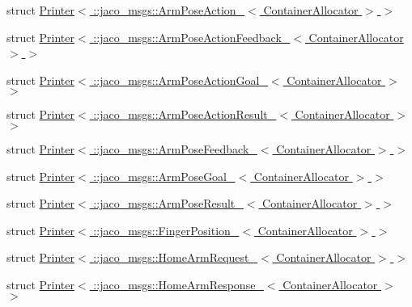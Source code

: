 \begin{DoxyCompactItemize}
\item 
struct \hyperlink{structros_1_1message__operations_1_1Printer_3_01_1_1jaco__msgs_1_1ArmPoseAction___3_01ContainerAllocator_01_4_01_4}{Printer$<$ \+::jaco\+\_\+msgs\+::\+Arm\+Pose\+Action\+\_\+$<$ Container\+Allocator $>$ $>$}
\item 
struct \hyperlink{structros_1_1message__operations_1_1Printer_3_01_1_1jaco__msgs_1_1ArmPoseActionFeedback___3_01ContainerAllocator_01_4_01_4}{Printer$<$ \+::jaco\+\_\+msgs\+::\+Arm\+Pose\+Action\+Feedback\+\_\+$<$ Container\+Allocator $>$ $>$}
\item 
struct \hyperlink{structros_1_1message__operations_1_1Printer_3_01_1_1jaco__msgs_1_1ArmPoseActionGoal___3_01ContainerAllocator_01_4_01_4}{Printer$<$ \+::jaco\+\_\+msgs\+::\+Arm\+Pose\+Action\+Goal\+\_\+$<$ Container\+Allocator $>$ $>$}
\item 
struct \hyperlink{structros_1_1message__operations_1_1Printer_3_01_1_1jaco__msgs_1_1ArmPoseActionResult___3_01ContainerAllocator_01_4_01_4}{Printer$<$ \+::jaco\+\_\+msgs\+::\+Arm\+Pose\+Action\+Result\+\_\+$<$ Container\+Allocator $>$ $>$}
\item 
struct \hyperlink{structros_1_1message__operations_1_1Printer_3_01_1_1jaco__msgs_1_1ArmPoseFeedback___3_01ContainerAllocator_01_4_01_4}{Printer$<$ \+::jaco\+\_\+msgs\+::\+Arm\+Pose\+Feedback\+\_\+$<$ Container\+Allocator $>$ $>$}
\item 
struct \hyperlink{structros_1_1message__operations_1_1Printer_3_01_1_1jaco__msgs_1_1ArmPoseGoal___3_01ContainerAllocator_01_4_01_4}{Printer$<$ \+::jaco\+\_\+msgs\+::\+Arm\+Pose\+Goal\+\_\+$<$ Container\+Allocator $>$ $>$}
\item 
struct \hyperlink{structros_1_1message__operations_1_1Printer_3_01_1_1jaco__msgs_1_1ArmPoseResult___3_01ContainerAllocator_01_4_01_4}{Printer$<$ \+::jaco\+\_\+msgs\+::\+Arm\+Pose\+Result\+\_\+$<$ Container\+Allocator $>$ $>$}
\item 
struct \hyperlink{structros_1_1message__operations_1_1Printer_3_01_1_1jaco__msgs_1_1FingerPosition___3_01ContainerAllocator_01_4_01_4}{Printer$<$ \+::jaco\+\_\+msgs\+::\+Finger\+Position\+\_\+$<$ Container\+Allocator $>$ $>$}
\item 
struct \hyperlink{structros_1_1message__operations_1_1Printer_3_01_1_1jaco__msgs_1_1HomeArmRequest___3_01ContainerAllocator_01_4_01_4}{Printer$<$ \+::jaco\+\_\+msgs\+::\+Home\+Arm\+Request\+\_\+$<$ Container\+Allocator $>$ $>$}
\item 
struct \hyperlink{structros_1_1message__operations_1_1Printer_3_01_1_1jaco__msgs_1_1HomeArmResponse___3_01ContainerAllocator_01_4_01_4}{Printer$<$ \+::jaco\+\_\+msgs\+::\+Home\+Arm\+Response\+\_\+$<$ Container\+Allocator $>$ $>$}

\end{DoxyCompactItemize}

